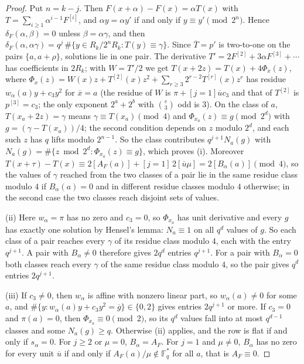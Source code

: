 \documentclass[11pt]{article}
\theoremstyle{definition}
\theoremstyle{remark}
\newcommand{\F}{\mathbb{F}}
\newcommand{\ol}[1]{\overline{#1}}
\begin{document}
\begin{proof}
Put $n=k-j$. Then $F(x+\alpha)-F(x)=\alpha T(x)$ with $T=\sum_{i\ge1}\alpha^{i-1}F^{[i]}$, and $\alpha y=\alpha y'$ if and
only if $y\equiv y'\pmod{2^n}$. Hence $\delta_F(\alpha,\beta)=0$ unless $\beta=\alpha\gamma$, and then
$\delta_F(\alpha,\alpha\gamma)=q^j\,\#\{y\in R_k/2^nR_k:T(y)\equiv\gamma\}$. Since $\ol T=p'$ is two-to-one on the pairs
$\{a,a+\rho\}$, solutions lie in one pair. The derivative $T'=2F^{[2]}+3\alpha F^{[3]}+\cdots$ has coefficients in
$2R_k$; with $W=T'/2$ we get $T(x+2z)=T(x)+4\Phi_x(z)$, where $\Phi_x(z)=W(x)z+T^{[2]}(x)z^2+\sum_{r\ge3}2^{r-2}T^{[r]}(x)z^r$
has residue $w_\alpha(a)y+c_3y^2$ for $\ol x=a$ (the residue of $W$ is $\pi+[j=1]\ol uc_3$ and that of $T^{[2]}$ is
$p^{[3]}=c_3$; the only exponent $2^a+2^b$ with $\binom e3$ odd is $3$). On the class of $a$, $T(x_a+2z)=\gamma$ means
$\gamma\equiv T(x_a)\pmod4$ and $\Phi_{x_a}(z)\equiv g\pmod{2^{d}}$ with $g=(\gamma-T(x_a))/4$; the second condition
depends on $z$ modulo $2^d$, and each such $z$ has $q$ lifts modulo $2^{n-1}$. So the class contributes
$q^{j+1}N_a(g)$ with $N_a(g)=\#\{z\bmod2^d:\Phi_{x_a}(z)\equiv g\}$, which proves (i).
Moreover $T(x+\tau)-T(x)\equiv2[A_F(a)]+[j=1]\,2[\ol u\mu]=2[B_\alpha(a)]\pmod4$, so the values of $\gamma$
reached from the two classes of a pair lie in the same residue class modulo $4$ if $B_\alpha(a)=0$ and in different
residue classes modulo $4$ otherwise; in the second case the two classes reach disjoint sets of values.

(ii) Here $w_\alpha=\pi$ has no zero and $c_3=0$, so $\Phi_{x_a}$ has unit derivative and every $g$ has exactly one
solution by Hensel's lemma: $N_a\equiv1$ on all $q^d$ values of $g$. So each class of a pair reaches every $\gamma$ of
its residue class modulo $4$, each with the entry $q^{j+1}$. A pair with $B_\alpha\ne0$ therefore gives $2q^d$
entries $q^{j+1}$. For a pair with $B_\alpha=0$ both classes reach every $\gamma$ of the same residue class modulo $4$, so the
pair gives $q^d$ entries $2q^{j+1}$.

(iii) If $c_3\ne0$, then $w_\alpha$ is affine with nonzero linear part, so $w_\alpha(a)\ne0$ for some $a$, and
$\#\{y:w_\alpha(a)y+c_3y^2=\ol g\}\in\{0,2\}$ gives entries $2q^{j+1}$ or more. If $c_3=0$ and $\pi(a)=0$, then
$\Phi_{x_a}\equiv0\pmod2$, so its $q^d$ values fall into at most $q^{d-1}$ classes and some $N_a(g)\ge q$. Otherwise (ii)
applies, and the row is flat if and only if $s_\alpha=0$. For $j\ge2$ or $\mu=0$, $B_\alpha=A_F$. For $j=1$ and
$\mu\ne0$, $B_\alpha$ has no zero for every unit $\ol u$ if and only if $A_F(a)/\mu\notin\F_q^*$ for all $a$, that is
$A_F\equiv0$.
\end{proof}
\end{document}
